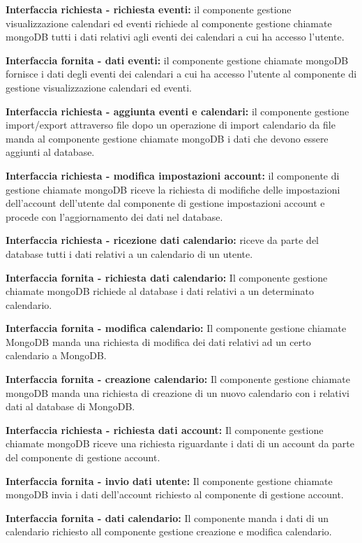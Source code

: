 \begin{listaPersonale}[DCI]{}
    \textbf{Interfaccia richiesta - richiesta eventi:} il componente gestione visualizzazione calendari ed eventi richiede al componente gestione chiamate mongoDB tutti i dati relativi agli eventi dei calendari a cui ha accesso l'utente.

    \textbf{Interfaccia fornita - dati eventi:} il componente gestione chiamate mongoDB fornisce i dati degli eventi dei calendari a cui ha accesso l'utente al componente di gestione visualizzazione calendari ed eventi.

    \textbf{Interfaccia richiesta - aggiunta eventi e calendari:} il componente gestione import/export attraverso file dopo un operazione di import calendario da file manda al componente gestione chiamate mongoDB i dati che devono essere aggiunti al database.

    \textbf{Interfaccia richiesta - modifica impostazioni account:} il componente di gestione chiamate mongoDB riceve la richiesta di modifiche delle impostazioni dell'account dell'utente dal componente di gestione impostazioni account e procede con l'aggiornamento dei dati nel database.

    \textbf{Interfaccia richiesta - ricezione dati calendario:} riceve da parte del database tutti i dati relativi a un calendario di un utente.

    \textbf{Interfaccia fornita - richiesta dati calendario:} Il componente gestione chiamate mongoDB richiede al database i dati relativi a un determinato calendario.

    \textbf{Interfaccia fornita - modifica calendario:} Il componente gestione chiamate MongoDB manda una richiesta di modifica dei dati relativi ad un certo calendario a MongoDB.

    \textbf{Interfaccia fornita - creazione calendario:} Il componente gestione chiamate mongoDB manda una richiesta di creazione di un nuovo calendario con i relativi dati al database di MongoDB.

    \textbf{Interfaccia richiesta - richiesta dati account:} Il componente gestione chiamate mongoDB riceve una richiesta riguardante i dati di un account da parte del componente di gestione account.

    \textbf{Interfaccia fornita - invio dati utente:} Il componente gestione chiamate mongoDB invia i dati dell'account richiesto al componente di gestione account.

    \textbf{Interfaccia fornita - dati calendario:} Il componente manda i dati di un calendario richiesto all componente gestione creazione e modifica calendario.


\end{listaPersonale}
